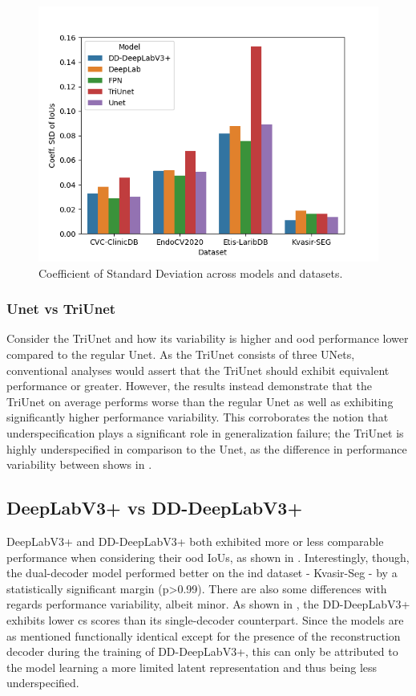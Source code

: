     \begin{figure}[ht]
        \centering
        \includegraphics[width=\linewidth]{illustrations/cstd_baseline.png}
        \caption{Coefficient of Standard Deviation across models and datasets.}
        \label{fig:baseline_cstd}
    \end{figure}
    
    \subsubsection{Unet vs TriUnet}
    Consider the TriUnet and how its variability is higher and \gls{ood} performance lower compared to the regular Unet. As the TriUnet consists of three UNets, conventional analyses would assert that the TriUnet should exhibit equivalent performance or greater. However, the results instead demonstrate that the TriUnet on average performs worse than the regular Unet as well as exhibiting significantly higher performance variability. This corroborates the notion that underspecification plays a significant role in generalization failure; the TriUnet is highly underspecified in comparison to the Unet, as the difference in performance variability between shows in .
    
    \subsection{DeepLabV3+ vs DD-DeepLabV3+} \label{dd-deeplab}
    DeepLabV3+ and DD-DeepLabV3+ both exhibited more or less comparable performance when considering their \gls{ood} IoUs, as shown in . Interestingly, though, the dual-decoder model performed better on the \gls{ind} dataset - Kvasir-Seg - by a statistically significant margin (p>0.99). There are also some differences with regards performance variability, albeit minor. As shown in , the DD-DeepLabV3+ exhibits lower \gls{cs} scores than its single-decoder counterpart. Since the models are as mentioned functionally identical except for the presence of the reconstruction decoder during the training of DD-DeepLabV3+, this can only be attributed to the model learning a more limited latent representation and thus being less underspecified. 
    
